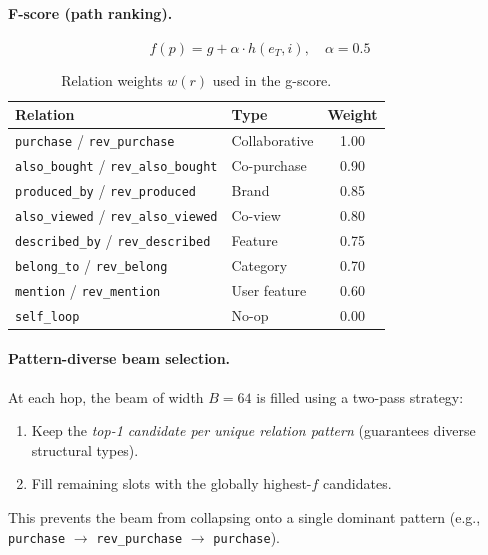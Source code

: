 \documentclass[12pt,a4paper]{article}
\begin{document}
\paragraph{F-score (path ranking).}
\begin{equation}
  f(p) = g + \alpha \cdot h(e_T, i), \quad \alpha = 0.5
\end{equation}

\begin{table}[h]
\centering
\caption{Relation weights $w(r)$ used in the g-score.}
\label{tab:rel-weights}
\begin{tabular}{llc}
\toprule
\textbf{Relation}  & \textbf{Type}         & \textbf{Weight} \\
\midrule
\texttt{purchase} / \texttt{rev\_purchase}     & Collaborative & 1.00 \\
\texttt{also\_bought} / \texttt{rev\_also\_bought} & Co-purchase  & 0.90 \\
\texttt{produced\_by} / \texttt{rev\_produced}     & Brand         & 0.85 \\
\texttt{also\_viewed} / \texttt{rev\_also\_viewed} & Co-view       & 0.80 \\
\texttt{described\_by} / \texttt{rev\_described}   & Feature       & 0.75 \\
\texttt{belong\_to} / \texttt{rev\_belong}         & Category      & 0.70 \\
\texttt{mention} / \texttt{rev\_mention}           & User feature  & 0.60 \\
\texttt{self\_loop}                                & No-op         & 0.00 \\
\bottomrule
\end{tabular}
\end{table}

\paragraph{Pattern-diverse beam selection.}
At each hop, the beam of width $B=64$ is filled using a two-pass strategy:
\begin{enumerate}[label=\arabic*.]
  \item Keep the \emph{top-1 candidate per unique relation pattern}
        (guarantees diverse structural types).
  \item Fill remaining slots with the globally highest-$f$ candidates.
\end{enumerate}
This prevents the beam from collapsing onto a single dominant pattern
(e.g., \texttt{purchase} $\to$ \texttt{rev\_purchase} $\to$ \texttt{purchase}).
\end{document}
